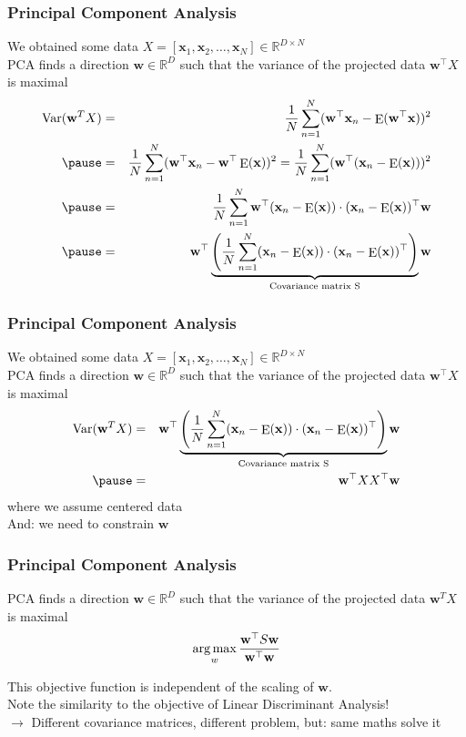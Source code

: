 \documentclass[Nike]{tuberlinbeamer}
\newcommand{\R}{\ensuremath{\mathds{R}}}
\newcommand{\bx}{{\mathbf x}}
\newcommand{\bw}{\mathbf{w}}
\DeclareMathOperator*{\E}{E}
\begin{document}
\begin{frame}\frametitle{Principal Component Analysis}
\small
We obtained some data $X=[\bx_1,\bx_2,\dots,\bx_N]\in\R^{D\times N}$\\
PCA finds a direction $\bw \in\R^D$ such that the variance of the projected data $\bw^\top X$
is maximal  \pause
\begin{eqnarray*}
\Var(\bw^T X) &=& \frac{1}{N} \sum_{n = 1}^{N} (\bw^\top \bx_n - \E(\bw^\top \bx))^2 \\ \pause
 &=& \frac{1}{N} \sum_{n = 1}^{N} (\bw^\top \bx_n - \bw^\top \E(\bx))^2 = \frac{1}{N} \sum_{n = 1}^{N} (\bw^\top (\bx_n - \E(\bx)))^2 \\\pause
 &=& \frac{1}{N} \sum_{n = 1}^{N} \bw^\top (\bx_n - \E(\bx)) \cdot  (\bx_n - \E(\bx))^\top \bw \\\pause
 &=& \bw^\top \underbrace{\left( \frac{1}{N} \sum_{n = 1}^{N}  (\bx_n - \E(\bx)) \cdot  (\bx_n - \E(\bx))^\top \right)}_{\text{Covariance matrix S}}\bw
\end{eqnarray*}
\end{frame}

\begin{frame}\frametitle{Principal Component Analysis}
\small
We obtained some data $X=[\bx_1,\bx_2,\dots,\bx_N]\in\R^{D\times N}$\\
\vspace{1em}
PCA finds a direction $\bw \in\R^D$ such that the variance of the projected data $\bw^\top X$
is maximal
\begin{eqnarray*}
\Var(\bw^T X) &=&  \bw^\top \underbrace{\left( \frac{1}{N} \sum_{n = 1}^{N}  (\bx_n - \E(\bx)) \cdot  (\bx_n - \E(\bx))^\top \right)}_{\text{Covariance matrix S}}\bw \\ \pause
 &=&  \bw^\top X X^\top\bw
\end{eqnarray*}
\hfill where we assume centered data\\
\vspace{1em} \pause
And: we need to constrain $\bw$
\end{frame}

\begin{frame}\frametitle{Principal Component Analysis}
PCA finds a direction $\bw \in\R^D$ such that the variance of the projected data $\bw^T X$
is maximal
\begin{align} \nonumber
 \argmax_w \frac{\bw^{\top} S\bw}{\bw^\top \bw}
\end{align}

This objective function is independent of the scaling of $\bw$.  \\ \pause
\vspace{2em}
Note the similarity to the objective of Linear Discriminant Analysis! \\
\vspace{1em}
$\rightarrow$ Different covariance matrices, different problem, but: same maths solve it
\end{frame}
\end{document}

